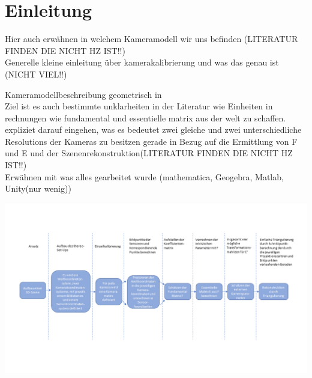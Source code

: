 \chapter{Einleitung}
\label{sec:einleitung} 

Hier auch erwähnen in welchem Kameramodell wir uns befinden (LITERATUR FINDEN DIE NICHT HZ IST!!)\\
Generelle kleine einleitung über kamerakalibrierung und was das genau ist (NICHT VIEL!!)

Kameramodellbeschreibung geometrisch in \cite{Jianzhong}\\

Ziel ist es auch bestimmte unklarheiten in der Literatur wie Einheiten in rechnungen wie fundamental und essentielle matrix aus der welt zu schaffen.\\

expliziet darauf eingehen, was es bedeutet zwei gleiche und zwei unterschiedliche Resolutions der Kameras zu besitzen gerade in Bezug auf die Ermittlung von F und E und der Szenenrekonstruktion(LITERATUR FINDEN DIE NICHT HZ IST!!)\\

Erwähnen mit was alles gearbeitet wurde (mathematica, Geogebra, Matlab, Unity(nur wenig))


	\begin{minipage}{\linewidth}
	\centering
	\includegraphics[width=1.\linewidth]{images/ArbeitsProzessMinimal.png}
	\label{fig:ArbeitsProzessMinimal}
\end{minipage}\\ \\


